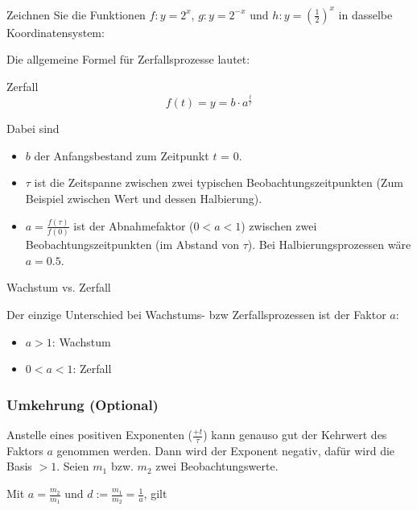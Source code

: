 Zeichnen Sie die Funktionen $f: y=2^x$, $g: y=2^{-x}$ und $h: y=\left(\frac12\right)^x$ in dasselbe Koordinatensystem:

\newpage
Die allgemeine Formel für Zerfallsprozesse lautet:

\begin{definition}{Zerfall}{}
$$f(t) = y = b\cdot{}a^{\frac{t}{\tau}}$$
\end{definition}


Dabei sind
\begin{itemize}
\item $b$ der Anfangsbestand zum Zeitpunkt $t$ = 0.
\item $\tau$ ist die Zeitspanne zwischen zwei typischen Beobachtungszeitpunkten (Zum Beispiel zwischen Wert und dessen Halbierung).
\item $a=\frac{f(\tau)}{f(0)}$ ist der Abnahmefaktor ($0<a<1$) zwischen zwei Beobachtungszeitpunkten (im Abstand von $\tau$). Bei Halbierungsprozessen \zB wäre $a=0.5$.
\end{itemize}

\begin{bemerkung}{Wachstum vs. Zerfall}{}

  Der einzige Unterschied bei Wachstums- bzw Zerfallsprozessen ist der
  Faktor $a$:

  \begin{itemize}
  \item $a>1$: Wachstum
  \item $0<a<1$: Zerfall
    \end{itemize}
  
  \end{bemerkung}
\newpage

\subsubsection{Umkehrung (Optional)}
Anstelle eines  positiven Exponenten ($\frac{+t}{\tau}$) kann genauso
gut der Kehrwert des Faktors $a$ genommen werden. Dann wird der
Exponent negativ, dafür wird die Basis $> 1$. Seien $m_1$ bzw. $m_2$
zwei Beobachtungswerte.

Mit $a = \frac{m_2}{m_1}$ und $d := \frac{m_1}{m_2} = \frac{1}{a}$, gilt

